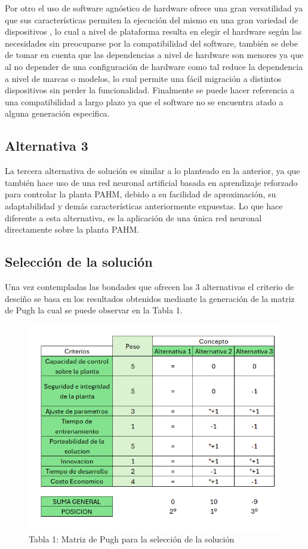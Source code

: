 \documentclass[12pt]{article}
\begin{document}
Por otro el uso de software agnóstico de hardware ofrece una gran versatilidad ya que sus características permiten la ejecución del mismo en una gran variedad de dispositivos , lo cual a nivel de plataforma resulta en elegir el hardware según las necesidades sin preocuparse por la compatibilidad del software, también se debe de tomar en cuenta que las dependencias a nivel de hardware son menores ya que al no depender de una configuración de hardware como tal reduce la dependencia a nivel de marcas o modelos, lo cual permite una fácil migración a distintos dispositivos sin perder la funcionalidad. Finalmente se puede hacer referencia a una compatibilidad a largo plazo ya que el software no se encuentra atado a alguna generación especifica\cite{krainiuk2021oneapi}. 


\subsection{Alternativa 3}

La tercera alternativa de solución es similar a lo planteado en la anterior, ya que también hace uso de una red neuronal artificial basada en aprendizaje reforzado para controlar la planta PAHM, debido a su facilidad de aproximación, su adaptabilidad y demás características anteriormente expuestas. Lo que hace diferente a esta alternativa, es la aplicación de una única red neuronal directamente sobre la planta PAHM\cite{15-tec}.

\subsection{Selección de la solución}

Una vez contempladas las bondades que ofrecen las 3 alternativas el criterio de desciño se basa en los resultados obtenidos mediante la generación de la matriz de Pugh la cual se puede observar en la Tabla 1.

\begin{figure}[h]
  \centering
  \includegraphics[scale=0.7]{tablas/pugh.png}
  \captionsetup{labelformat=empty}  %
  \caption{Tabla 1: Matriz de Pugh para la selección de la solución}
\end{figure}
\end{document}
